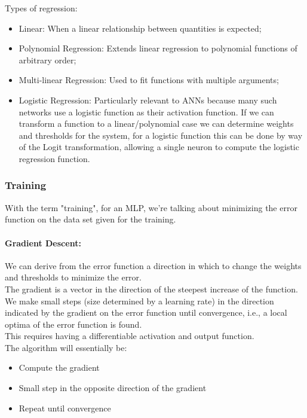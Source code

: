 Types of regression: 
\begin{itemize}
	\item Linear: When a linear relationship between quantities is expected;
	\item Polynomial Regression: Extends linear regression to polynomial functions of arbitrary order;
	\item Multi-linear Regression: Used to fit functions with multiple arguments;
	\item Logistic Regression: Particularly relevant to ANNs because many such networks use a logistic function as their activation function. If we can transform a function to a linear/polynomial case we can determine weights and thresholds for the system, for a logistic function this can be done by way of the Logit transformation, allowing a single neuron to compute the logistic regression function.
\end{itemize}

\subsubsection{Training}

With the term "training", for an MLP, we're talking about minimizing the error function on the data set given for the training.\\

\paragraph{Gradient Descent:} We can derive from the error function a direction in which to change the weights and thresholds to minimize the error.\\
The gradient is a vector in the direction of the steepest increase of the function.\\
We make small steps (size determined by a learning rate) in the direction indicated by the gradient on the error function until convergence, i.e., a local optima of the error function is found.\\
This requires having a differentiable activation and output function.\\
The algorithm will essentially be: 
\begin{itemize}
	\item Compute the gradient
	\item Small step in the opposite direction of the gradient
	\item Repeat until convergence
\end{itemize}

